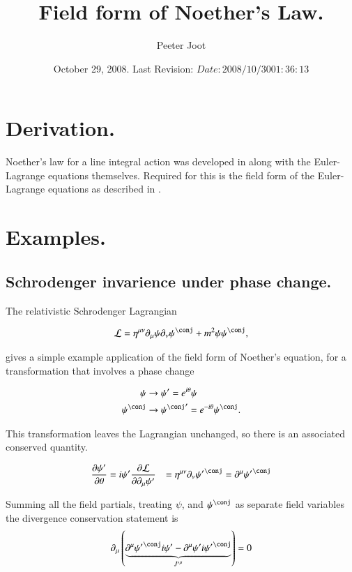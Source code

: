 \documentclass{article}
\title{Field form of Noether's Law.}
\author{Peeter Joot}
\date{ October 29, 2008.  Last Revision: $Date: 2008/10/30 01:36:13 $ }
\begin{document}
\maketitle{}

\section{ Derivation. }

Noether's law for a line integral action was developed in 
\cite{PJEulerLagrange} along with the Euler-Lagrange equations
themselves.  Required for this is
the field form of the Euler-Lagrange equations as described
in
\cite{PJFieldLagrangian}.

\section{ Examples. }

\subsection{ Schrodenger invarience under phase change. }

The relativistic Schrodenger Lagrangian

\begin{align*}
\LL = \eta^{\mu\nu}\partial_\mu \psi \partial_\nu \psi^\conj + m^2 \psi \psi^\conj,
\end{align*}

gives a simple example application of the field form of Noether's equation, for a 
transformation that involves a phase change

\begin{align*}
\psi &\rightarrow \psi' = e^{i\theta}\psi \\
\psi^\conj &\rightarrow {\psi^\conj}' = e^{-i\theta}\psi^\conj.
\end{align*}

This transformation leaves the Lagrangian unchanged, so there is an associated conserved
quantity.

\begin{align*}
\PD{\theta}{\psi'} &= i \psi'
\PD{\partial_\mu \psi'}{\LL} &= \eta^{\mu\nu}\partial_\nu {\psi'}^\conj = \partial^\mu {\psi'}^\conj 
\end{align*}

Summing all the field partials, treating $\psi$, and $\psi^\conj$ as separate
field variables the divergence conservation statement is
\begin{align*}
\partial_\mu \left(
\underbrace{
\partial^\mu {\psi'}^\conj i\psi'
-\partial^\mu {\psi'} i{\psi'}^\conj
}_{{J'}^\mu}
\right) = 0
\end{align*}
\end{document}
